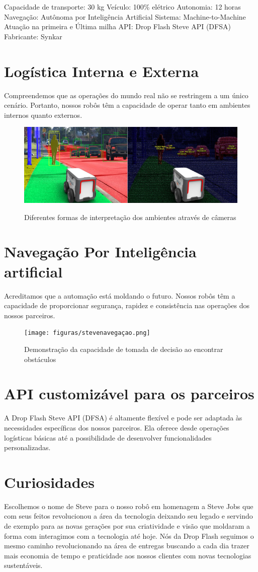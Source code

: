Capacidade de transporte: 30 kg Veículo: 100\% elétrico
Autonomia: 12 horas Navegação: Autônoma por Inteligência Artificial
Sistema: Machine-to-Machine Atuação na primeira e Última milha
API: Drop Flash Steve API (DFSA) Fabricante: Synkar

\section{Logística Interna e Externa}
Compreendemos que as operações do mundo real não se restringem a um único cenário. Portanto, nossos robôs têm a capacidade de operar tanto em ambientes internos quanto externos.

\begin{figure} [!ht]
    {\centering
    \caption{Diferentes formas de interpretação dos ambientes através de câmeras}
    \includegraphics[width=0.5\linewidth]{figuras/stevelogistica.png}
    \label{fig:enter-label}
    }
\end{figure}

\section{Navegação Por Inteligência artificial}
Acreditamos que a automação está moldando o futuro. Nossos robôs têm a capacidade de proporcionar segurança, rapidez e consistência nas operações dos nossos parceiros.

\begin{figure}[!ht]
   { \centering
    \caption{Demonstração da capacidade de tomada de decisão ao encontrar obstáculos}
    \texttt{[image: figuras/stevenavegaçao.png]}
    \label{fig:enter-label}
    }
\end{figure}

\section{API customizável para os parceiros}
A Drop Flash Steve API (DFSA) é altamente flexível e pode ser adaptada às necessidades específicas dos nossos parceiros. Ela oferece desde operações logísticas básicas até a possibilidade de desenvolver funcionalidades personalizadas.

\section{Curiosidades}
Escolhemos o nome de Steve para o nosso robô em homenagem a Steve Jobs que com seus feitos revolucionou a área da tecnologia deixando seu legado e servindo de exemplo para as novas gerações por sua criatividade e visão que moldaram a forma com interagimos com a
tecnologia até hoje. Nós da Drop Flash seguimos o mesmo caminho revolucionando na área de entregas buscando a cada dia trazer mais economia de tempo e praticidade aos nossos clientes com novas tecnologias sustentáveis.